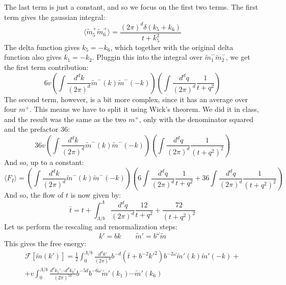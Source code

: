 \documentclass{article}
\begin{document}
The last term is just a constant, and so we focus on the first two terms. The first term gives the gaussian integral:
\begin{equation}
    \langle\tilde{m}_5^{+}\tilde{m}_6^{+}\rangle = \frac{(2\pi)^d \delta(k_5 + k_6)}{t + k_5^2}
\end{equation}
The delta function gives $k_5 = -k_6$, which together with the original delta function also gives $k_1 = -k_2$. Pluggin this into the integral over $\tilde{m}_1^{-}\tilde{m}_2^{-}$, we get the first term contribution:
\begin{equation}
    6v\left(\int \frac{d^dk}{(2\pi)^d} \tilde{m}^{-}(k)\tilde{m}^{-}(-k)\right)
    \left(
        \int \frac{d^dq}{(2\pi)^d}\frac{1}{t + q^2}
    \right)
\end{equation}
The second term, however, is a bit more complex, since it has an average over four $m^{+}$. This means we have to split it using Wick's theorem. We did it in class, and the result was the same as the two $m^{+}$, only with the denominator squared and the prefactor 36:
\begin{equation}
    36v\left(\int \frac{d^dk}{(2\pi)^d} \tilde{m}^{-}(k)\tilde{m}^{-}(-k)\right)
    \left(
        \int \frac{d^dq}{(2\pi)^d}\frac{1}{\left(t + q^2\right)^2}
    \right)
\end{equation}
And so, up to a constant:
\begin{equation}
    \langle F_I \rangle = \left(
        \int \frac{d^dk}{(2\pi)^d} \tilde{m}^{-}(k)\tilde{m}^{-}(-k)
    \right)
    \left(
        6 \int \frac{d^dq}{(2\pi)^d}\frac{1}{t + q^2} + 36 \int \frac{d^dq}{(2\pi)^d}\frac{1}{\left(t + q^2\right)^2}
    \right)
\end{equation}
And so, the flow of $t$ is now given by:
\begin{equation}
    \bar{t} = t + \int_{\Lambda/b}^\Lambda \frac{d^dq}{(2\pi)^d} \frac{ 12}{t + q^2} + \frac{72}{\left(t + q^2\right)^2}
\end{equation}
Let us perform the rescaling and renormalization steps:
\begin{equation}
    k' = bk
    \qquad
    \tilde{m}' = b^{\omega}\tilde{m}
\end{equation}
This gives the free energy:
\begin{equation}
\begin{gathered}
    \mathcal{F}[\tilde{m}(k')] = \frac{1}{2}\int_{0}^{\Lambda/b} \frac{d^dk'}{(2\pi)^d}b^{-d}(\bar{t} + b^{-2}k'^2)b^{-2\omega}\tilde{m}'(k)\tilde{m}'(-k) + \\ +
    v\int_{0}^{\Lambda/b} \frac{d^dk_1'\cdots d^dk_6'}{(2\pi)^{5d}}b^{-5d}b^{-6\omega}\tilde{m}'(k_1)\cdots\tilde{m}'(k_6)
\end{gathered}
\end{equation}
\end{document}
